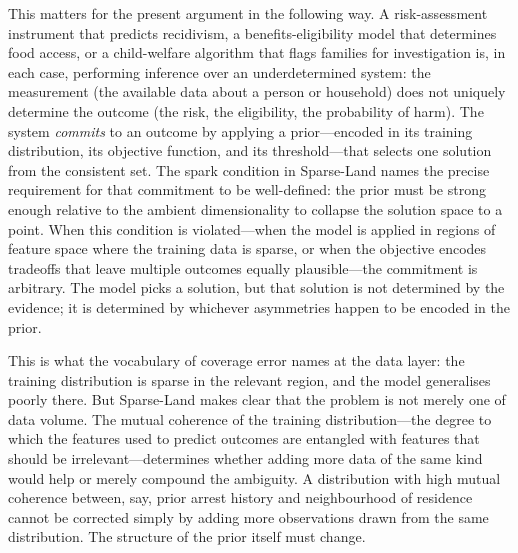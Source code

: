 \documentclass[12pt, a4paper]{article}
\begin{document}
This matters for the present argument in the following way. A risk-assessment instrument that predicts recidivism, a benefits-eligibility model that determines food access, or a child-welfare algorithm that flags families for investigation is, in each case, performing inference over an underdetermined system: the measurement (the available data about a person or household) does not uniquely determine the outcome (the risk, the eligibility, the probability of harm). The system \emph{commits} to an outcome by applying a prior---encoded in its training distribution, its objective function, and its threshold---that selects one solution from the consistent set. The spark condition in Sparse-Land names the precise requirement for that commitment to be well-defined: the prior must be strong enough relative to the ambient dimensionality to collapse the solution space to a point. When this condition is violated---when the model is applied in regions of feature space where the training data is sparse, or when the objective encodes tradeoffs that leave multiple outcomes equally plausible---the commitment is arbitrary. The model picks a solution, but that solution is not determined by the evidence; it is determined by whichever asymmetries happen to be encoded in the prior.

This is what the vocabulary of coverage error names at the data layer: the training distribution is sparse in the relevant region, and the model generalises poorly there. But Sparse-Land makes clear that the problem is not merely one of data volume. The mutual coherence of the training distribution---the degree to which the features used to predict outcomes are entangled with features that should be irrelevant---determines whether adding more data of the same kind would help or merely compound the ambiguity. A distribution with high mutual coherence between, say, prior arrest history and neighbourhood of residence cannot be corrected simply by adding more observations drawn from the same distribution. The structure of the prior itself must change.
\end{document}
